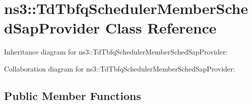 \hypertarget{classns3_1_1TdTbfqSchedulerMemberSchedSapProvider}{}\section{ns3\+:\+:Td\+Tbfq\+Scheduler\+Member\+Sched\+Sap\+Provider Class Reference}
\label{classns3_1_1TdTbfqSchedulerMemberSchedSapProvider}


Inheritance diagram for ns3\+:\+:Td\+Tbfq\+Scheduler\+Member\+Sched\+Sap\+Provider\+:


Collaboration diagram for ns3\+:\+:Td\+Tbfq\+Scheduler\+Member\+Sched\+Sap\+Provider\+:
\subsection*{Public Member Functions}
